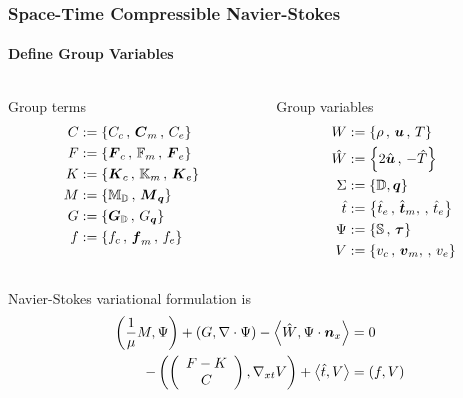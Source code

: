 \documentclass[18pt,xcolor=table]{beamer}
\begin{document}
\begin{frame}[t]
\frametitle{Space-Time Compressible Navier-Stokes}
\framesubtitle{Define Group Variables}
\begin{columns}[t]
\begin{column}{0.5\textwidth}
Group terms
\vspace{-2ex}
\begin{align*}
C&:=\left\{ C_c\,,\, \boldsymbol C_m\,,\, C_e \right\}\\
F&:=\left\{ \boldsymbol F_c\,,\, \mathbb{F}_m\,,\, \boldsymbol F_e \right\}\\
K&:=\left\{ \boldsymbol K_c\,,\, \mathbb{K}_m\,,\, \boldsymbol K_e \right\}\\
M&:=\left\{ \mathbb{M}_{\mathbb{D}}\,,\, \boldsymbol M_{\boldsymbol q} \right\}\\
G&:=\left\{ \boldsymbol G_{\mathbb{D}}\,,\, G_{\boldsymbol q} \right\}\\
f&:=\left\{ f_c\,,\, \boldsymbol f_m\,,\, f_e \right\}\\
\end{align*}
\end{column}
\begin{column}{0.5\textwidth}
Group variables
\vspace{-2ex}
\begin{align*}
W&:=\left\{ \rho\,,\,\boldsymbol u\,,\,T \right\}\\
\hat W&:=\left\{ 2\hat{\boldsymbol u}\,,\,-\hat T \right\}\\
\Sigma&:=\left\{ \mathbb{D},\boldsymbol q \right\}\\
\hat t&:=\left\{ \hat t_e\,,\,\hat{\boldsymbol t}_m,\,,\,\hat t_e \right\}\\
\Psi&:=\left\{ \mathbb{S}\,,\,\boldsymbol\tau \right\}\\
V&:=\left\{ v_c\,,\,\boldsymbol v_m,\,,\,v_e \right\}
\end{align*}
\end{column}
\end{columns}
Navier-Stokes variational formulation is
\begin{align*}
\left( \frac{1}{\mu}M,\Psi \right)+\left( G,\nabla\cdot\Psi \right)-\left\langle \hat W,\Psi\cdot\boldsymbol n_x \right\rangle&=0\\
-\left( \left( \begin{array}{c} F-K\\ C\\ \end{array} \right),\nabla_{xt} V \right)+\left\langle \hat t,V \right\rangle&=\left( f,V \right)
\end{align*}
\end{frame}
\end{document}
